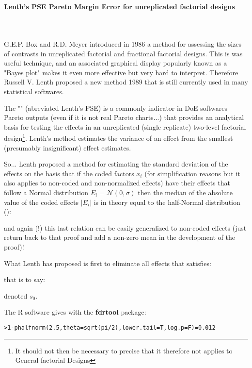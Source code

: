 	\paragraph{Lenth's PSE Pareto Margin Error for unreplicated factorial designs}\label{pareto margin error}\mbox{}\\\\
	G.E.P. Box and R.D. Meyer introduced in 1986 a method for assessing the sizes of contrasts in unreplicated factorial and fractional factorial designs. This is was useful technique, and an associated graphical display popularly known as a "Bayes plot" makes it even more effective but very hard to interpret. Therefore Russell V. Lenth proposed a new method 1989 that is still currently used in many statistical softwares.
	
	The "" (abreviated Lenth's PSE) is a commonly indicator in DoE softwares Pareto outputs (even if it is not real Pareto charts...) that provides an analytical basis for testing the effects in an unreplicated (single replicate) two-level factorial design\footnote{It should not then be necessary to precise that it therefore not applies to General factorial Designs}. Lenth's method estimates the variance of an effect from the smallest (presumably insignificant) effect estimates.
	
	So... Lenth proposed a method for estimating the standard deviation of the effects on the basis that if the coded factors $x_i$ (for simplification reasons but it also applies to non-coded and non-normalized effects) have their effects that follow a Normal distribution $E_i=\mathcal{N}(0,\sigma)$ then the median of the absolute value of the coded effects $|E_i|$ is in theory equal to the half-Normal distribution ():
	
	and again (!) this last relation can be easily generalized to non-coded effects (just return back to that proof and add a non-zero mean in the development of the proof)!
	
	What Lenth has proposed is first to eliminate all effects that satisfies:
	
	that is to say:
	
	denoted $s_0$.
	
	The R software gives with the \textbf{fdrtool} package:
	\begin{center}
	\texttt{>1-phalfnorm(2.5,theta=sqrt(pi/2),lower.tail=T,log.p=F)=0.012}
	\end{center}
	
